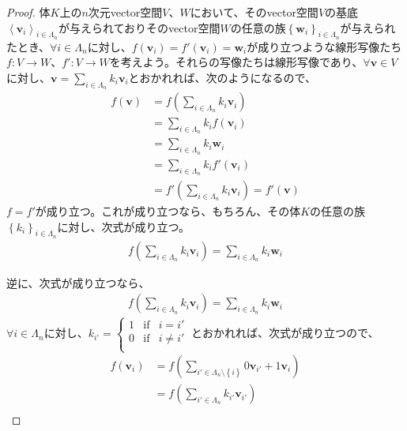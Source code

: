\documentclass[dvipdfmx]{jsarticle}
\begin{document}
\begin{proof}
体$K$上の$n$次元vector空間$V$、$W$において、そのvector空間$V$の基底$\left\langle \mathbf{v}_{i} \right\rangle_{i \in \varLambda_{n}}$が与えられておりそのvector空間$W$の任意の族$\left\{ \mathbf{w}_{i} \right\}_{i \in \varLambda_{n}}$が与えられたとき、$\forall i \in \varLambda_{n}$に対し、$f\left( \mathbf{v}_{i} \right) = f'\left( \mathbf{v}_{i} \right) = \mathbf{w}_{i}$が成り立つような線形写像たち$f:V \rightarrow W$、$f':V \rightarrow W$を考えよう。それらの写像たちは線形写像であり、$\forall\mathbf{v} \in V$に対し、$\mathbf{v} = \sum_{i \in \varLambda_{n}} {k_{i}\mathbf{v}_{i}}$とおかれれば、次のようになるので、
\begin{align*}
f\left( \mathbf{v} \right) &= f\left( \sum_{i \in \varLambda_{n}} {k_{i}\mathbf{v}_{i}} \right)\\
&= \sum_{i \in \varLambda_{n}} {k_{i}f\left( \mathbf{v}_{i} \right)}\\
&= \sum_{i \in \varLambda_{n}} {k_{i}\mathbf{w}_{i}}\\
&= \sum_{i \in \varLambda_{n}} {k_{i}f'\left( \mathbf{v}_{i} \right)}\\
&= f'\left( \sum_{i \in \varLambda_{n}} {k_{i}\mathbf{v}_{i}} \right) = f'\left( \mathbf{v} \right)
\end{align*}
$f = f'$が成り立つ。これが成り立つなら、もちろん、その体$K$の任意の族$\left\{ k_{i} \right\}_{i \in \varLambda_{n}}$に対し、次式が成り立つ。
\begin{align*}
f\left( \sum_{i \in \varLambda_{n}} {k_{i}\mathbf{v}_{i}} \right) = \sum_{i \in \varLambda_{n}} {k_{i}\mathbf{w}_{i}}
\end{align*}\par
逆に、次式が成り立つなら、
\begin{align*}
f\left( \sum_{i \in \varLambda_{n}} {k_{i}\mathbf{v}_{i}} \right) = \sum_{i \in \varLambda_{n}} {k_{i}\mathbf{w}_{i}}
\end{align*}
$\forall i \in \varLambda_{n}$に対し、$k_{i'} = \left\{ \begin{matrix}
1 & \mathrm{if} & i = i' \\
0 & \mathrm{if} & i \neq i' \\
\end{matrix} \right.\ $とおかれれば、次式が成り立つので、
\begin{align*}
f\left( \mathbf{v}_{i} \right) &= f\left( \sum_{i' \in \varLambda_{n} \setminus \left\{ i \right\}} {0\mathbf{v}_{i'}} + 1\mathbf{v}_{i} \right)\\
&= f\left( \sum_{i' \in \varLambda_{n}} {k_{i'}\mathbf{v}_{i'}} \right)\\

\end{align*}
\end{proof}
\end{document}
